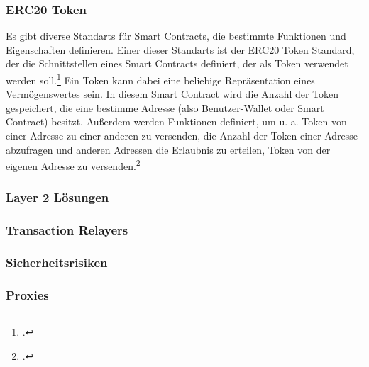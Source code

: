 \subsubsection{ERC20 Token}
\label{sec:definition-erc20-token}
Es gibt diverse Standarts für Smart Contracts, die bestimmte Funktionen und Eigenschaften definieren.
Einer dieser Standarts ist der ERC20 Token Standard, der die Schnittstellen eines Smart Contracts definiert, der als Token verwendet werden soll.\footcite[Vgl. hierzu und im Folgenden][]{w7}
Ein Token kann dabei eine beliebige Repräsentation eines Vermögenswertes sein.
In diesem Smart Contract wird die Anzahl der Token gespeichert, die eine bestimme Adresse (also Benutzer-Wallet oder Smart Contract) besitzt.
Außerdem werden Funktionen definiert, um u. a. Token von einer Adresse zu einer anderen zu versenden, die Anzahl der Token einer Adresse abzufragen und anderen Adressen die Erlaubnis zu erteilen, Token von der eigenen Adresse zu versenden.\footcites[Vgl.][]{w8}[]{w7}

\subsubsection{Layer 2 Lösungen}
\label{sec:definition-layer-2-solutions}

\subsubsection{Transaction Relayers}
\label{sec:definition-transaction-relayers}

\subsubsection{Sicherheitsrisiken}
\label{sec:definition-sicherheitsrisiken}

\subsubsection{Proxies}
\label{sec:definition-proxies}
